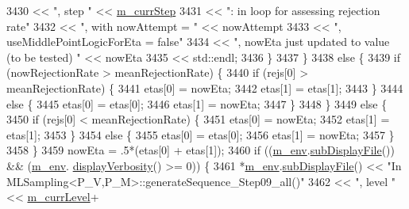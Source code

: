 \begin{DoxyCode}
3430                                         << \textcolor{stringliteral}{", step "}  << \hyperlink{class_q_u_e_s_o_1_1_m_l_sampling_a1b1f8ccb4823bdfa26ec652f0807c63e}{m\_currStep}
3431                                         << \textcolor{stringliteral}{": in loop for assessing rejection rate"}
3432                                         << \textcolor{stringliteral}{", with nowAttempt = "}  << nowAttempt
3433                                         << \textcolor{stringliteral}{", useMiddlePointLogicForEta = false"}
3434                                         << \textcolor{stringliteral}{", nowEta just updated to value (to be tested) "} << nowEta
3435                                         << std::endl;
3436               \}
3437             \}
3438             \textcolor{keywordflow}{else} \{
3439               \textcolor{keywordflow}{if} (nowRejectionRate > meanRejectionRate) \{
3440                 \textcolor{keywordflow}{if} (rejs[0] > meanRejectionRate) \{
3441                   etas[0] = nowEta;
3442                   etas[1] = etas[1];
3443                 \}
3444                 \textcolor{keywordflow}{else} \{
3445                   etas[0] = etas[0];
3446                   etas[1] = nowEta;
3447                 \}
3448               \}
3449               \textcolor{keywordflow}{else} \{
3450                 \textcolor{keywordflow}{if} (rejs[0] < meanRejectionRate) \{
3451                   etas[0] = nowEta;
3452                   etas[1] = etas[1];
3453                 \}
3454                 \textcolor{keywordflow}{else} \{
3455                   etas[0] = etas[0];
3456                   etas[1] = nowEta;
3457                 \}
3458               \}
3459               nowEta = .5*(etas[0] + etas[1]);
3460               \textcolor{keywordflow}{if} ((\hyperlink{class_q_u_e_s_o_1_1_m_l_sampling_a13f1ca4fe9f94822fe572a743eaced1d}{m\_env}.\hyperlink{class_q_u_e_s_o_1_1_base_environment_a8a0064746ae8dddfece4229b9ad374d6}{subDisplayFile}()) && (\hyperlink{class_q_u_e_s_o_1_1_m_l_sampling_a13f1ca4fe9f94822fe572a743eaced1d}{m\_env}.
      \hyperlink{class_q_u_e_s_o_1_1_base_environment_a1fe5f244fc0316a0ab3e37463f108b96}{displayVerbosity}() >= 0)) \{
3461                 *\hyperlink{class_q_u_e_s_o_1_1_m_l_sampling_a13f1ca4fe9f94822fe572a743eaced1d}{m\_env}.\hyperlink{class_q_u_e_s_o_1_1_base_environment_a8a0064746ae8dddfece4229b9ad374d6}{subDisplayFile}() << \textcolor{stringliteral}{"In
       MLSampling<P\_V,P\_M>::generateSequence\_Step09\_all()"}
3462                                         << \textcolor{stringliteral}{", level "} << \hyperlink{class_q_u_e_s_o_1_1_m_l_sampling_af9416874c856e50f3b35270e801f17e4}{m\_currLevel}+

\end{DoxyCode}
